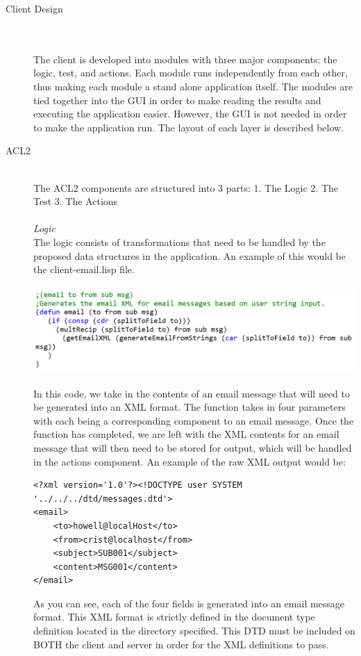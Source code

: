 \documentclass[11pt, letterpaper]{report}
\begin{document}
\begin{description}
\item[\large Client Design]\hfill \\ \hfill \\
The client is developed into modules with three major components: the logic, test, and actions. Each module runs independently from each other, thus making each module a stand alone application itself. The modules are tied together into the GUI in order to make reading the results and executing the application easier. However, the GUI is not needed in order to make the application run. The layout of each layer is described below. \\
\item[ACL2]\hfill \\
The ACL2 components are structured into 3 parts:
1.	The Logic
2.	The Test
3.	The Actions \\ \\
\textit{Logic}\\
The logic consists of transformations that need to be handled by the proposed data structures in the application. An example of this would be the client-email.lisp file.\\\\
\includegraphics[scale=0.3]{clientlisp}\\\\
In this code, we take in the contents of an email message that will need to be generated into an XML format. The function takes in four parameters with each being a corresponding component to an email message. Once the function has completed, we are left with the XML contents for an email message that will then need to be stored for output, which will be handled in the actions component. An example of the raw XML output would be:
\begin{verbatim}
<?xml version='1.0'?><!DOCTYPE user SYSTEM '../../../dtd/messages.dtd'>
<email>
    <to>howell@localHost</to>
    <from>crist@localhost</from>
    <subject>SUB001</subject>
    <content>MSG001</content>
</email>
\end{verbatim}
As you can see, each of the four fields is generated into an email message format. This XML format is strictly defined in the document type definition located in the directory specified. This DTD must be included on BOTH the client and server in order for the XML definitions to pass.


\end{description}
\end{document}
